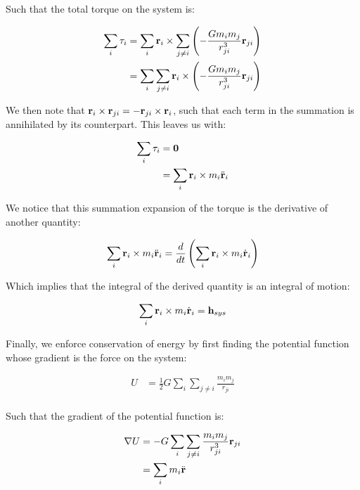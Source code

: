 Such that the total torque on the system is:

\begin{align*}
    \sum_i \mathbf{\tau}_i &= \sum_i \mathbf{r}_i \times \sum_{j \neq i} \left( -\frac{G m_i m_j}{r_{ji}^3} \mathbf{r}_{ji} \right) \\
    &= \sum_i \sum_{j \neq i} \mathbf{r}_i \times \left( -\frac{G m_i m_j}{r_{ji}^3} \mathbf{r}_{ji} \right) \\
\end{align*}

We then note that $\mathbf{r}_i \times \mathbf{r}_{ji} = -\mathbf{r}_{ji} \times \mathbf{r}_i$, such that each term in the summation is annihilated by its counterpart. This leaves us with:

\begin{align*}
    \sum_i \mathbf{\tau}_i &= \mathbf{0} \\
    &= \sum_i \mathbf{r}_i \times m_i \ddot{\mathbf{r}}_i
\end{align*}

We notice that this summation expansion of the torque is the derivative of another quantity:

\begin{align*}
    \sum_i \mathbf{r}_i \times m_i \ddot{\mathbf{r}}_i &= \frac{d}{dt} \left( \sum_i \mathbf{r}_i \times m_i \dot{\mathbf{r}}_i \right) \\
\end{align*}

Which implies that the integral of the derived quantity is an integral of motion:

\begin{align*}
    \sum_i \mathbf{r}_i \times m_i \dot{\mathbf{r}}_i &= \mathbf{h}_{sys} \\
\end{align*}

Finally, we enforce conservation of energy by first finding the potential function whose gradient is the force on the system:

\begin{align*}
    U &= \frac{1}{2} G \sum_i \sum_{j \neq i} \frac{m_i m_j}{r_{ji}} \\
\end{align*}

Such that the gradient of the potential function is:

\begin{align*}
    \nabla U &= -G \sum_i \sum_{j \neq i} \frac{m_i m_j}{r_{ji}^3} \mathbf{r}_{ji} \\
    &= \sum_i m_i \ddot{\mathbf{r}} \\
\end{align*}

